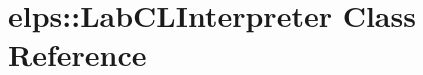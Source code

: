 \hypertarget{classelps_1_1_lab_c_l_interpreter}{\section{elps\+:\+:Lab\+C\+L\+Interpreter Class Reference}
\label{classelps_1_1_lab_c_l_interpreter}
}
